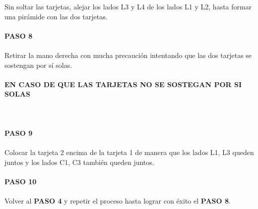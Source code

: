 \documentclass{article}
\begin{document}
Sin soltar las tarjetas, alejar los lados L3 y L4 de los lados L1 y L2, hasta formar una pirámide con las dos tarjetas. \\\\
\textbf{PASO 8} \\\\
Retirar la mano derecha con mucha precaución intentando que las dos tarjetas se sostengan por sí solas. \\\\
\textbf{EN CASO DE QUE LAS TARJETAS NO SE SOSTEGAN POR SI SOLAS} \\\\
\\\\
\textbf{PASO 9} \\\\
Colocar la tarjeta 2 encima de la tarjeta 1 de manera que los lados L1, L3 queden juntos y los lados C1, C3 también queden juntos. \\\\
\textbf{PASO 10} \\\\
Volver al \textbf{PASO 4} y repetir el proceso hasta lograr con éxito el \textbf{PASO 8}.
\end{document}
